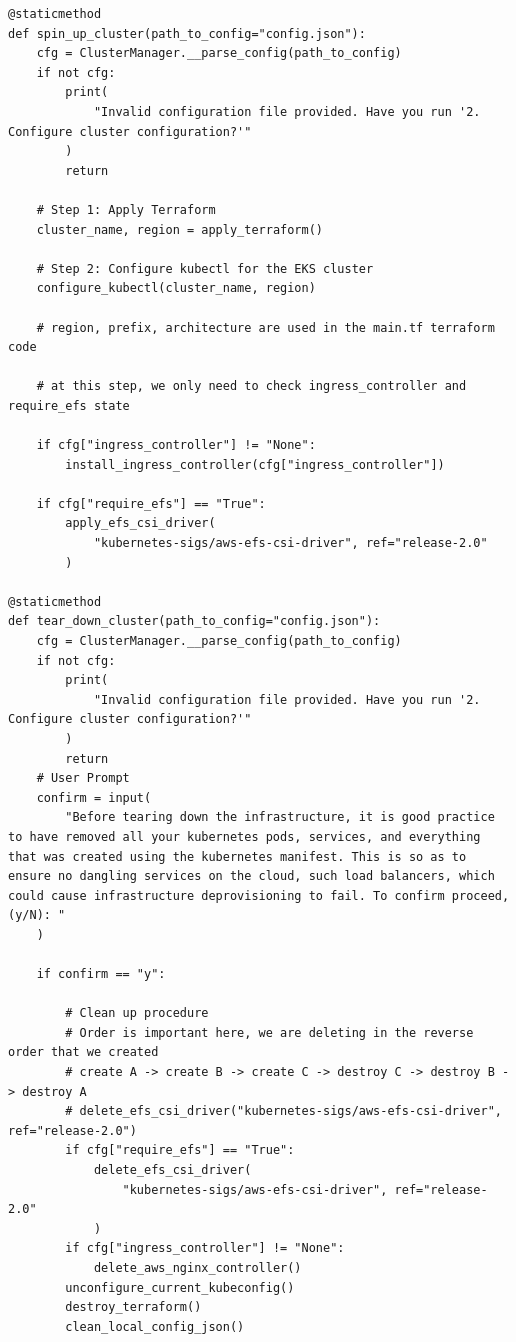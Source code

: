 \begin{lstlisting}[xleftmargin=10pt, caption={Cluster Manager Provisioning and Teardown methods}, label={lst:cluster-manager}]
@staticmethod
def spin_up_cluster(path_to_config="config.json"):
    cfg = ClusterManager.__parse_config(path_to_config)
    if not cfg:
        print(
            "Invalid configuration file provided. Have you run '2. Configure cluster configuration?'"
        )
        return

    # Step 1: Apply Terraform
    cluster_name, region = apply_terraform()

    # Step 2: Configure kubectl for the EKS cluster
    configure_kubectl(cluster_name, region)

    # region, prefix, architecture are used in the main.tf terraform code

    # at this step, we only need to check ingress_controller and require_efs state

    if cfg["ingress_controller"] != "None":
        install_ingress_controller(cfg["ingress_controller"])

    if cfg["require_efs"] == "True":
        apply_efs_csi_driver(
            "kubernetes-sigs/aws-efs-csi-driver", ref="release-2.0"
        )

@staticmethod
def tear_down_cluster(path_to_config="config.json"):
    cfg = ClusterManager.__parse_config(path_to_config)
    if not cfg:
        print(
            "Invalid configuration file provided. Have you run '2. Configure cluster configuration?'"
        )
        return
    # User Prompt
    confirm = input(
        "Before tearing down the infrastructure, it is good practice to have removed all your kubernetes pods, services, and everything that was created using the kubernetes manifest. This is so as to ensure no dangling services on the cloud, such load balancers, which could cause infrastructure deprovisioning to fail. To confirm proceed, (y/N): "
    )

    if confirm == "y":

        # Clean up procedure
        # Order is important here, we are deleting in the reverse order that we created
        # create A -> create B -> create C -> destroy C -> destroy B -> destroy A
        # delete_efs_csi_driver("kubernetes-sigs/aws-efs-csi-driver", ref="release-2.0")
        if cfg["require_efs"] == "True":
            delete_efs_csi_driver(
                "kubernetes-sigs/aws-efs-csi-driver", ref="release-2.0"
            )
        if cfg["ingress_controller"] != "None":
            delete_aws_nginx_controller()
        unconfigure_current_kubeconfig()
        destroy_terraform()
        clean_local_config_json()

\end{lstlisting}

